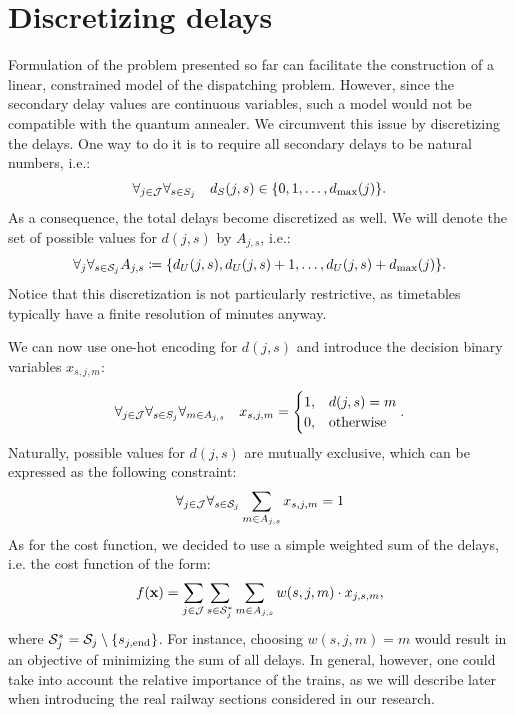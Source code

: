 \section{Discretizing delays}
Formulation of the problem presented so far can facilitate the construction of
a linear, constrained model of the dispatching problem. However, since the
secondary delay values are continuous variables, such a model would not be
compatible with the quantum annealer. We circumvent this issue by discretizing
the delays. One way to do it is to require all secondary delays to be natural
numbers, i.e.:
\begin{equation}
  \forall_{j \in \mathcal{J}} \forall_{s \in S_{j}}\quad  d_{S}(j, s) \in \{0, 1, \ldots, d_{\max}(j)\}.
\end{equation}
As a consequence, the total delays become discretized as well. We will denote
the set of possible values for $d(j, s)$ by $A_{j, s}$, i.e.:
    \begin{equation}
      \forall_{j}\forall_{s \in \mathcal{S}_j}  A_{j, s} \coloneq \{d_{U}(j, s), d_{U}(j, s) + 1, \ldots, d_{U}(j, s) + d_{\max}(j)\}.
    \end{equation}
    Notice that this discretization is not particularly restrictive, as timetables
    typically have a finite resolution of minutes anyway.

    We can now use one-hot encoding for $d(j, s)$ and introduce the decision binary variables
  $x_{s, j, m}$:

    \begin{equation}
      \forall_{j \in \mathcal{J}}\forall_{s \in S_{j}} \forall_{m \in A_{j, s}} \quad x_{s,j,m} = \begin{cases}
        1, & d(j, s) = m      \\
        0, & \mbox{otherwise}
      \end{cases}.
    \end{equation}
    Naturally, possible values for $d(j, s)$ are mutually exclusive, which can be
    expressed as the following constraint:
    \begin{equation}
      \label{eq:onehotconstraint}
      \forall_{j \in \mathcal{J}}\forall_{s \in \mathcal{S}_j} \sum_{m \in A_{j, s}} x_{s, j, m} = 1
    \end{equation}
    As for the cost function, we decided to use a simple weighted sum of the
    delays, i.e. the cost function of the form:
    \begin{equation}
      \label{eq:qubo:cost}
      f(\mathbf{x}) = \sum_{j \in \mathcal{J}}\sum_{s \in \mathcal{S}_{j}^{*}} \sum_{m \in A_{j,s}} w(s,j,m) \cdot x_{j,s,m},
    \end{equation}
    where $\mathcal{S}_{j}^{*} = \mathcal{S}_j \setminus \{s_{j,\operatorname*{end}}\}$. For instance, choosing $w(s, j,
  m)=m$ would result in an objective of minimizing the sum of all delays. In
general, however, one could take into account the relative importance of the
trains, as we will describe later when introducing the real railway sections
considered in our research.

